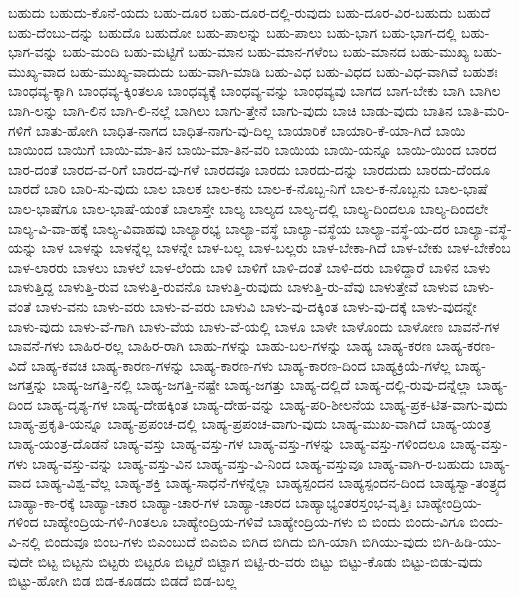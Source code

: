 {ಬಹುದು
ಬಹುದು-ಕೊನೆ-ಯದು
ಬಹು-ದೂರ
ಬಹು-ದೂರ-ದಲ್ಲಿ-ರುವುದು
ಬಹು-ದೂರ-ವಿರ-ಬಹುದು
ಬಹುದೆ
ಬಹು-ದೆಂಬು-ದನ್ನು
ಬಹುದೊ
ಬಹುದೋ
ಬಹು-ಪಾಲನ್ನು
ಬಹು-ಪಾಲು
ಬಹು-ಭಾಗ
ಬಹು-ಭಾಗ-ದಲ್ಲಿ
ಬಹು-ಭಾಗ-ವನ್ನು
ಬಹು-ಮಂದಿ
ಬಹು-ಮಟ್ಟಿಗೆ
ಬಹು-ಮಾನ
ಬಹು-ಮಾನ-ಗಳೆಂಬ
ಬಹು-ಮಾನದ
ಬಹು-ಮುಖ್ಯ
ಬಹು-ಮುಖ್ಯ-ವಾದ
ಬಹು-ಮುಖ್ಯ-ವಾದುದು
ಬಹು-ವಾಗಿ-ಮಾಡಿ
ಬಹು-ವಿಧ
ಬಹು-ವಿಧದ
ಬಹು-ವಿಧ-ವಾಗಿವೆ
ಬಹುಶಃ
ಬಾಂಧವ್ಯ-ಕ್ಕಾಗಿ
ಬಾಂಧವ್ಯ-ಕ್ಕಿಂತಲೂ
ಬಾಂಧವ್ಯಕ್ಕೆ
ಬಾಂಧವ್ಯ-ವನ್ನು
ಬಾಂಧವ್ಯವು
ಬಾಗದ
ಬಾಗ-ಬೇಕು
ಬಾಗಿ
ಬಾಗಿಲ
ಬಾಗಿ-ಲನ್ನು
ಬಾಗಿ-ಲಿನ
ಬಾಗಿ-ಲಿ-ನಲ್ಲೆ
ಬಾಗಿಲು
ಬಾಗು-ತ್ತೇನೆ
ಬಾಗು-ವುದು
ಬಾಚಿ
ಬಾಡು-ವುದು
ಬಾತಿನ
ಬಾತಿ-ಮರಿ-ಗಳಿಗೆ
ಬಾತು-ಹೋಗಿ
ಬಾಧಿತ-ನಾಗದ
ಬಾಧಿತ-ನಾಗು-ವು-ದಿಲ್ಲ
ಬಾಯಾರಿಕೆ
ಬಾಯಾರಿ-ಕೆ-ಯಾ-ಗಿದೆ
ಬಾಯಿ
ಬಾಯಿಂದ
ಬಾಯಿಗೆ
ಬಾಯಿ-ಮಾ-ತಿನ
ಬಾಯಿ-ಮಾ-ತಿನ-ವರಿ
ಬಾಯಿಯ
ಬಾಯಿ-ಯನ್ನೂ
ಬಾಯಿ-ಯಿಂದ
ಬಾರದ
ಬಾರ-ದಂತೆ
ಬಾರದ-ವ-ರಿಗೆ
ಬಾರದ-ವು-ಗಳೆ
ಬಾರದವೂ
ಬಾರದು
ಬಾರದು-ದನ್ನು
ಬಾರದುದು
ಬಾರದು-ದೆಂದೂ
ಬಾರದೆ
ಬಾರಿ
ಬಾರಿ-ಸು-ವುದು
ಬಾಲ
ಬಾಲಕ
ಬಾಲ-ಕನು
ಬಾಲ-ಕ-ನೊಬ್ಬ-ನಿಗೆ
ಬಾಲ-ಕ-ನೊಬ್ಬನು
ಬಾಲ-ಭಾಷೆ
ಬಾಲ-ಭಾಷೆಗೂ
ಬಾಲ-ಭಾಷೆ-ಯಂತೆ
ಬಾಲಾಸ್ತೇ
ಬಾಲ್ಯ
ಬಾಲ್ಯದ
ಬಾಲ್ಯ-ದಲ್ಲಿ
ಬಾಲ್ಯ-ದಿಂದಲೂ
ಬಾಲ್ಯ-ದಿಂದಲೇ
ಬಾಲ್ಯ-ವಿ-ವಾ-ಹಕ್ಕೆ
ಬಾಲ್ಯ-ವಿವಾಹವು
ಬಾಲ್ಯಾರಭ್ಯ
ಬಾಲ್ಯಾ-ವಸ್ಥೆ
ಬಾಲ್ಯಾ-ವಸ್ಥೆಯ
ಬಾಲ್ಯಾ-ವಸ್ಥೆ-ಯ-ದರ
ಬಾಲ್ಯಾ-ವಸ್ಥೆ-ಯನ್ನು
ಬಾಳ
ಬಾಳನ್ನು
ಬಾಳನ್ನೆಲ್ಲ
ಬಾಳನ್ನೇ
ಬಾಳ-ಬಲ್ಲ
ಬಾಳ-ಬಲ್ಲರು
ಬಾಳ-ಬೇಕಾ-ಗಿದೆ
ಬಾಳ-ಬೇಕು
ಬಾಳ-ಬೇಕೆಂಬ
ಬಾಳ-ಲಾರರು
ಬಾಳಲು
ಬಾಳಲೆ
ಬಾಳ-ಲೆಂದು
ಬಾಳಿ
ಬಾಳಿಗೆ
ಬಾಳಿ-ದಂತೆ
ಬಾಳಿ-ದರು
ಬಾಳಿದ್ದಾರೆ
ಬಾಳಿನ
ಬಾಳು
ಬಾಳುತ್ತಿದ್ದ
ಬಾಳುತ್ತಿ-ರುವ
ಬಾಳುತ್ತಿ-ರುವನೊ
ಬಾಳುತ್ತಿ-ರುವುದು
ಬಾಳುತ್ತಿ-ರು-ವೆವು
ಬಾಳುತ್ತೇವೆ
ಬಾಳುವ
ಬಾಳು-ವಂತೆ
ಬಾಳು-ವನು
ಬಾಳು-ವರು
ಬಾಳು-ವ-ವರು
ಬಾಳುವಿ
ಬಾಳು-ವು-ದಕ್ಕಿಂತ
ಬಾಳು-ವು-ದಕ್ಕೆ
ಬಾಳು-ವುದನ್ನೇ
ಬಾಳು-ವುದು
ಬಾಳು-ವೆ-ಗಾಗಿ
ಬಾಳು-ವೆಯ
ಬಾಳು-ವೆ-ಯಲ್ಲಿ
ಬಾಳೂ
ಬಾಳೇ
ಬಾಳೊಂದು
ಬಾಳೋಣ
ಬಾವನೆ-ಗಳ
ಬಾವನೆ-ಗಳು
ಬಾಹಿರ-ರಲ್ಲ
ಬಾಹಿರ-ರಾಗಿ
ಬಾಹು-ಗಳನ್ನು
ಬಾಹು-ಬಲ-ಗಳನ್ನು
ಬಾಹ್ಯ
ಬಾಹ್ಯ-ಕರಣ
ಬಾಹ್ಯ-ಕರಣ-ವಿದೆ
ಬಾಹ್ಯ-ಕವಚ
ಬಾಹ್ಯ-ಕಾರಣ-ಗಳನ್ನು
ಬಾಹ್ಯ-ಕಾರಣ-ಗಳು
ಬಾಹ್ಯ-ಕಾರಣ-ದಿಂದ
ಬಾಹ್ಯಕ್ರಿಯೆ-ಗಳೆಲ್ಲ
ಬಾಹ್ಯ-ಜಗತ್ತನ್ನು
ಬಾಹ್ಯ-ಜಗತ್ತಿ-ನಲ್ಲಿ
ಬಾಹ್ಯ-ಜಗತ್ತಿ-ನಷ್ಟೇ
ಬಾಹ್ಯ-ಜಗತ್ತು
ಬಾಹ್ಯ-ದಲ್ಲಿದೆ
ಬಾಹ್ಯ-ದಲ್ಲಿ-ರುವು-ದನ್ನೆಲ್ಲಾ
ಬಾಹ್ಯ-ದಿಂದ
ಬಾಹ್ಯ-ದೃಶ್ಯ-ಗಳ
ಬಾಹ್ಯ-ದೇಹಕ್ಕಿಂತ
ಬಾಹ್ಯ-ದೇಹ-ವನ್ನು
ಬಾಹ್ಯ-ಪರಿ-ಶೀಲನೆಯ
ಬಾಹ್ಯ-ಪ್ರಕ-ಟಿತ-ವಾಗು-ವುದು
ಬಾಹ್ಯ-ಪ್ರಕೃತಿ-ಯನ್ನೂ
ಬಾಹ್ಯ-ಪ್ರಪಂಚ-ದಲ್ಲಿ
ಬಾಹ್ಯ-ಪ್ರಪಂಚ-ವಾಗು-ವುದು
ಬಾಹ್ಯ-ಮುಖ-ವಾಗಿದೆ
ಬಾಹ್ಯ-ಯಂತ್ರ
ಬಾಹ್ಯ-ಯಂತ್ರ-ದೊಡನೆ
ಬಾಹ್ಯ-ವಸ್ತು
ಬಾಹ್ಯ-ವಸ್ತು-ಗಳ
ಬಾಹ್ಯ-ವಸ್ತು-ಗಳನ್ನು
ಬಾಹ್ಯ-ವಸ್ತು-ಗಳಿಂದಲೂ
ಬಾಹ್ಯ-ವಸ್ತು-ಗಳು
ಬಾಹ್ಯ-ವಸ್ತು-ವನ್ನು
ಬಾಹ್ಯ-ವಸ್ತು-ವಿನ
ಬಾಹ್ಯ-ವಸ್ತು-ವಿ-ನಿಂದ
ಬಾಹ್ಯ-ವಸ್ತುವೂ
ಬಾಹ್ಯ-ವಾಗಿ-ರ-ಬಹುದು
ಬಾಹ್ಯ-ವಾದ
ಬಾಹ್ಯ-ವಿಶ್ವ-ವೆಲ್ಲ
ಬಾಹ್ಯ-ಶಕ್ತಿ
ಬಾಹ್ಯ-ಸಾಧನೆ-ಗಳನ್ನೆಲ್ಲಾ
ಬಾಹ್ಯಸ್ಪಂದನ
ಬಾಹ್ಯಸ್ಪಂದನ-ದಿಂದ
ಬಾಹ್ಯಸ್ವಾ-ತಂತ್ರ್ಯದ
ಬಾಹ್ಯಾ-ಕಾ-ರಕ್ಕೆ
ಬಾಹ್ಯಾ-ಚಾರ
ಬಾಹ್ಯಾ-ಚಾರ-ಗಳ
ಬಾಹ್ಯಾ-ಚಾರದ
ಬಾಹ್ಯಾಭ್ಯಂತರಸ್ತಂಭ-ವೃತ್ತಿಃ
ಬಾಹ್ಯೇಂದ್ರಿಯ-ಗಳಿಂದ
ಬಾಹ್ಯೇಂದ್ರಿಯ-ಗಳಿ-ಗಿಂತಲೂ
ಬಾಹ್ಯೇಂದ್ರಿಯ-ಗಳಿವೆ
ಬಾಹ್ಯೇಂದ್ರಿಯ-ಗಳು
ಬಿ
ಬಿಂದು
ಬಿಂದು-ವಿಗೂ
ಬಿಂದು-ವಿ-ನಲ್ಲಿ
ಬಿಂದುವೂ
ಬಿಂಬ-ಗಳು
ಬಿಎಂಬುದೆ
ಬಿಎಬಿಎ
ಬಿಗಿದ
ಬಿಗಿದು
ಬಿಗಿ-ಯಾಗಿ
ಬಿಗಿಯು-ವುದು
ಬಿಗಿ-ಹಿಡಿ-ಯು-ವುದೇ
ಬಿಟ್ಟ
ಬಿಟ್ಟನು
ಬಿಟ್ಟರು
ಬಿಟ್ಟರೂ
ಬಿಟ್ಟರೆ
ಬಿಟ್ಟಾಗ
ಬಿಟ್ಟಿ-ರು-ವರು
ಬಿಟ್ಟು
ಬಿಟ್ಟು-ಕೊಡು
ಬಿಟ್ಟು-ಬಿಡು-ವುದು
ಬಿಟ್ಟು-ಹೋಗಿ
ಬಿಡ
ಬಿಡ-ಕೂಡದು
ಬಿಡದೆ
ಬಿಡ-ಬಲ್ಲ
}
